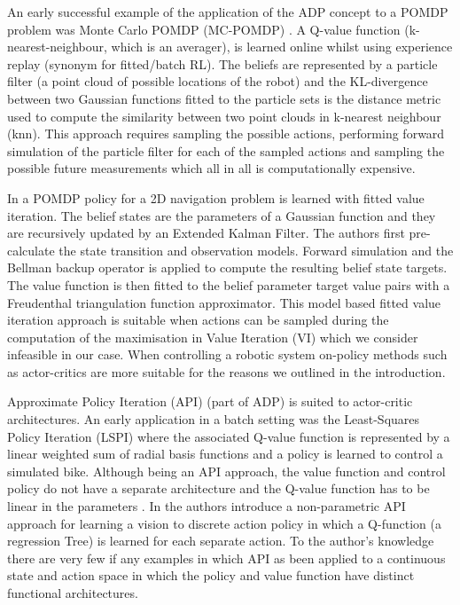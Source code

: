 \documentclass[final,5p,times,twocolumn]{elsarticle}
\begin{document}
An early successful example of the application of the ADP concept to a POMDP problem was Monte Carlo POMDP (MC-POMDP) 
\cite{Thrun_1999}. A Q-value function (k-nearest-neighbour, which is an averager), is learned online whilst using 
experience replay (synonym for fitted/batch RL). The beliefs are represented by a particle filter 
(a point cloud of possible locations of the robot) and the KL-divergence 
between two Gaussian functions fitted to the particle sets is the distance metric used to compute the similarity 
between two point clouds in k-nearest neighbour (knn). This approach requires sampling the possible actions, performing 
forward simulation of the particle filter for each of the sampled actions and sampling the possible future measurements which all 
in all is computationally expensive. 

In \cite{PPOMDP_2006} a POMDP policy for a 2D navigation problem is learned with fitted value iteration.
The belief states are the parameters of a Gaussian function and they are recursively updated by an Extended Kalman Filter. 
The authors first pre-calculate the state transition and observation models. Forward simulation and 
the Bellman backup operator is applied to compute the resulting belief state targets.
The value function is then fitted to the belief parameter target value pairs with a Freudenthal triangulation function approximator. 
This model based fitted value iteration approach is suitable when actions can be sampled during the computation 
of the maximisation in Value Iteration (VI) which we consider infeasible in our case.
When controlling a robotic system on-policy methods such as actor-critics are more suitable for 
the reasons we outlined in the introduction.

Approximate Policy Iteration (API) \cite{Neuro_1996,Bertsekas2011} (part of ADP) is suited to actor-critic architectures.
An early application in a batch setting was the Least-Squares Policy Iteration (LSPI) \cite{LSPI_2003} where the associated 
Q-value function is represented by a linear weighted sum of radial basis functions and a policy is learned to control 
a simulated bike. Although being an API approach, the value function and control policy do not have a separate 
architecture and the Q-value function has to be linear in the parameters \cite{Sutton00policygradient}. In 
\cite{Jodogne2006} the authors introduce a non-parametric API approach for learning a vision to discrete action policy in which 
a Q-function (a regression Tree) is learned for each separate action. To the author's knowledge there are very 
few if any examples in which API as been applied to a continuous state and action space in which the policy and value function 
have distinct functional architectures. 
\end{document}
